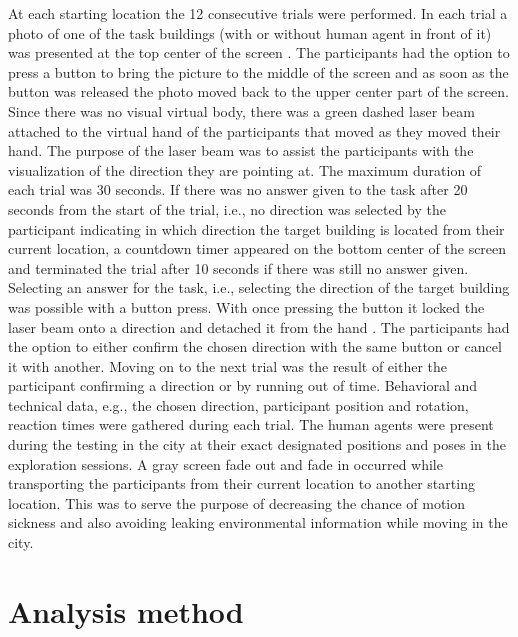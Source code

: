 At each starting location the 12 consecutive trials were performed. In each trial a photo of one of the task buildings (with or without human agent in front of it) was presented at the top center of the screen . The participants had the option to press a button to bring the picture to the middle of the screen  and as soon as the button was released the photo moved back to the upper center part of the screen. Since there was no visual virtual body, there was a green dashed laser beam  attached to the virtual hand of the participants that moved as they moved their hand. The purpose of the laser beam was to assist the participants with the visualization of the direction they are pointing at. The maximum duration of each trial was 30 seconds. If there was no answer given to the task after 20 seconds from the start of the trial, i.e., no direction was selected by the participant indicating in which direction the target building is located from their current location, a countdown timer appeared on the bottom center of the screen  and terminated the trial after 10 seconds if there was still no answer given. \\

Selecting an answer for the task, i.e., selecting the direction of the target building was possible with a button press. With once pressing the button it locked the laser beam onto a direction and detached it from the hand . The participants had the option to either confirm the chosen direction with the same button or cancel it with another. Moving on to the next trial was the result of either the participant confirming a direction or by running out of time. Behavioral and technical data, e.g., the chosen direction, participant position and rotation, reaction times were gathered during each trial. The human agents were present during the testing in the city at their exact designated positions and poses in the exploration sessions. A gray screen fade out and fade in occurred while transporting the participants from their current location to another starting location. This was to serve the purpose of decreasing the chance of motion sickness and also avoiding leaking environmental information while moving in the city.



\section{Analysis method}

